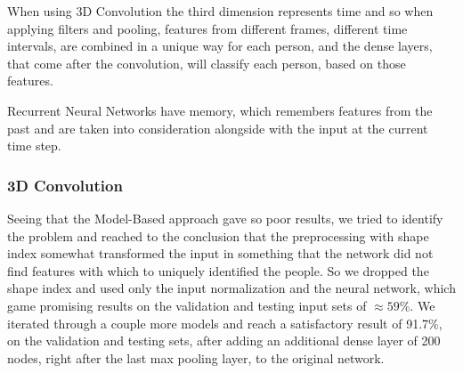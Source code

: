 \documentclass[12pt]{article}
\theoremstyle{definition}
\begin{document}
	When using 3D Convolution the third dimension represents time and so when applying filters and pooling, features from different frames, different time intervals, are combined in a unique way for each person, and the dense layers, that come after the convolution, will classify each person, based on those features.

	Recurrent Neural Networks have memory, which remembers features from the past and are taken into consideration alongside with the input at the current time step.

	\subsubsection{3D Convolution}

	Seeing that the Model-Based approach gave so poor results, we tried to identify the problem and reached to the conclusion that the preprocessing with shape index somewhat transformed the input in something that the network did not find features with which to uniquely identified the people. So we dropped the shape index and used only the input normalization and the neural network, which game promising results on the validation and testing input sets of $\approx 59\%$. We iterated through a couple more models and reach a satisfactory result of 91.7\%, on the validation and testing sets, after adding an additional dense layer of 200 nodes, right after the last max pooling layer, to the original network.
\end{document}
